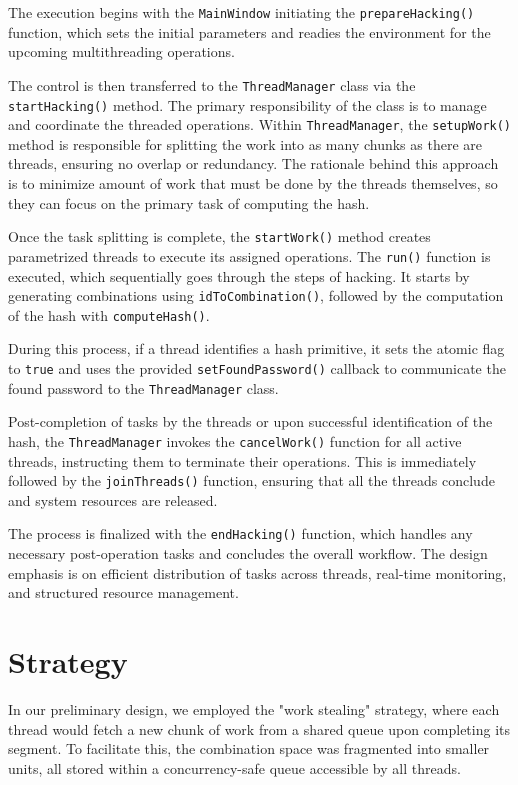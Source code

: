 \documentclass{article}
\begin{document}
The execution begins with the \texttt{MainWindow} initiating the \texttt{prepareHacking()} function, which sets the initial parameters
and readies the environment for the upcoming multithreading operations.

The control is then transferred to the \texttt{ThreadManager} class via the \texttt{startHacking()} method. The primary
responsibility of the class is to manage and coordinate the threaded operations. Within \texttt{ThreadManager},
the \texttt{setupWork()}
method is responsible for splitting the work into as many chunks as there are threads, ensuring no overlap or
redundancy. The rationale behind this approach is to minimize amount of work that must be done by the threads
themselves,
so they can focus on the primary task of computing the hash.

Once the task splitting is complete, the \texttt{startWork()} method creates parametrized threads to execute its assigned
operations. The \texttt{run()} function is executed, which sequentially goes through the steps of hacking. It starts by
generating combinations using \texttt{idToCombination()}, followed by the computation of the hash with \texttt{computeHash()}.

During this process, if a thread identifies a hash primitive, it sets the atomic flag to \texttt{true} and uses the
provided \texttt{setFoundPassword()} callback to communicate the found password to the \texttt{ThreadManager} class.

Post-completion of tasks by the threads or upon successful identification of the hash, the \texttt{ThreadManager} invokes
the \texttt{cancelWork()} function for all active threads, instructing them to terminate their operations. This is immediately
followed by the \texttt{joinThreads()} function, ensuring that all the threads conclude and system resources are released.

The process is finalized with the \texttt{endHacking()} function, which handles any necessary post-operation tasks and
concludes the overall workflow. The design emphasis is on efficient distribution of tasks across threads, real-time
monitoring, and structured resource management.

\section{Strategy}

In our preliminary design, we employed the "work stealing" strategy, where each thread would fetch a new chunk of work
from a shared queue upon completing its segment. To facilitate this, the combination space was fragmented into smaller
units, all stored within a concurrency-safe queue accessible by all threads.
\end{document}

